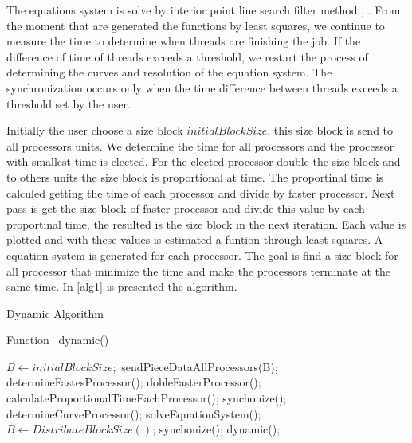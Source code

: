\documentclass[journal]{IEEEtran}
\begin{document}
The equations system is solve by interior point line search filter method \cite{point}, . From the moment that are generated  the functions by least squares, we continue to measure the time to determine when threads are finishing the job. If the difference of time of threads exceeds a threshold, we restart the process of determining the curves and resolution of the equation system. The synchronization occurs only when the time difference between threads exceeds a threshold set by the user.

Initially the user choose a size block $initialBlockSize$, this size block is send to all processors units. We determine the time for all processors and the processor with smallest time is elected. For the elected processor double the size block and to others units the size block is proportional at time. The proportinal time is calculed getting the time of each processor and divide by faster processor. Next pass is get the size block of faster processor and divide this value by each proportinal time, the resulted is the size block in the next iteration. Each value is plotted and with these values is estimated a funtion through least squares.  A equation system is generated for each processor. The goal is find a size block for all processor that minimize the time and make the processors terminate at the same time. In \ref{alg1} is presented the algorithm. 


\begin{algorithm}

\caption{Dynamic Algorithm}
\label{alg1}

\begin{algorithmic}		

\STATE Function~ dynamic()

\STATE $B \leftarrow initialBlockSize;$
		\STATE sendPieceDataAllProcessors(B);
		\STATE determineFastesProcessor();
		\STATE dobleFasterProcessor();
	        \STATE calculateProportionalTimeEachProcessor();
		\STATE synchonize();
		\STATE determineCurveProcessor();
	\ENDWHILE
	\STATE solveEquationSystem();
	\STATE $B \leftarrow DistributeBlockSize()$;
		\STATE synchonize();
		\STATE dynamic();	
    	\ENDIF

\ENDWHILE

\end{algorithmic}
\end{algorithm}
\end{document}
